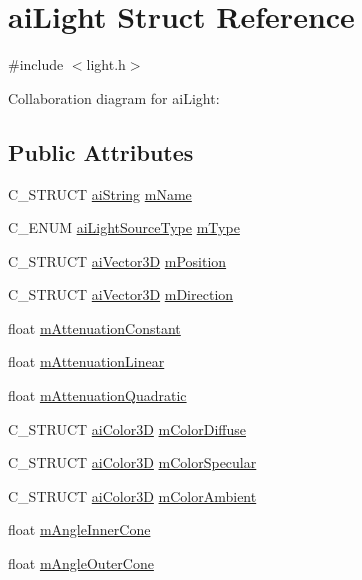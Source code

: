 \hypertarget{structai_light}{\section{ai\-Light Struct Reference}
\label{structai_light}
}


{\ttfamily \#include $<$light.\-h$>$}



Collaboration diagram for ai\-Light\-:
\subsection*{Public Attributes}
\begin{DoxyCompactItemize}
\item 
C\-\_\-\-S\-T\-R\-U\-C\-T \hyperlink{structai_string}{ai\-String} \hyperlink{structai_light_a92806413f16230728b04e5f379fd00c0}{m\-Name}
\item 
C\-\_\-\-E\-N\-U\-M \hyperlink{light_8h_a7a75cb224d903e71e8daede432449766}{ai\-Light\-Source\-Type} \hyperlink{structai_light_a4cba1741875dd92724ff55be91c60c2b}{m\-Type}
\item 
C\-\_\-\-S\-T\-R\-U\-C\-T \hyperlink{structai_vector3_d}{ai\-Vector3\-D} \hyperlink{structai_light_a5daf9c9ad2613603b847a527123611f0}{m\-Position}
\item 
C\-\_\-\-S\-T\-R\-U\-C\-T \hyperlink{structai_vector3_d}{ai\-Vector3\-D} \hyperlink{structai_light_af3776d5e4e6065cb6dd7e10dc656dada}{m\-Direction}
\item 
float \hyperlink{structai_light_ae8804b3c309527ca0f85d676bab55710}{m\-Attenuation\-Constant}
\item 
float \hyperlink{structai_light_aefda311eaa785ea345782dfa95be817c}{m\-Attenuation\-Linear}
\item 
float \hyperlink{structai_light_ab4fb07bfa40a807661b1ed1791838a6d}{m\-Attenuation\-Quadratic}
\item 
C\-\_\-\-S\-T\-R\-U\-C\-T \hyperlink{structai_color3_d}{ai\-Color3\-D} \hyperlink{structai_light_a22e7feebbfaf53adf73bd9f581636efd}{m\-Color\-Diffuse}
\item 
C\-\_\-\-S\-T\-R\-U\-C\-T \hyperlink{structai_color3_d}{ai\-Color3\-D} \hyperlink{structai_light_aa79ae6ad6a10f0cb9c740e23b6bb01bf}{m\-Color\-Specular}
\item 
C\-\_\-\-S\-T\-R\-U\-C\-T \hyperlink{structai_color3_d}{ai\-Color3\-D} \hyperlink{structai_light_a5188b60e6fbaf1635fa780913508e3cd}{m\-Color\-Ambient}
\item 
float \hyperlink{structai_light_abad0466811938623e98bf1d334143f9a}{m\-Angle\-Inner\-Cone}
\item 
float \hyperlink{structai_light_a20fd332a5f9d8e8cb94816ff2b0ae7f4}{m\-Angle\-Outer\-Cone}
\end{DoxyCompactItemize}


